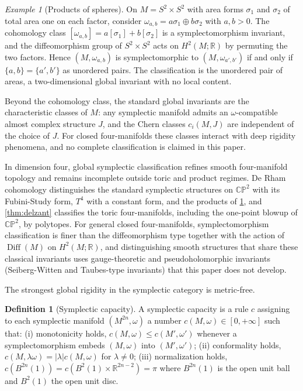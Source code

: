 \documentclass[11pt,letterpaper]{article}
\theoremstyle{definition}
\newtheorem{definition}[theorem]{Definition}
\theoremstyle{remark}
\newtheorem{example}[theorem]{Example}
\begin{document}
\begin{example}[Products of spheres]
\label{ex:product-spheres}
On $M = S^{2} \times S^{2}$ with area forms $\sigma_1$ and $\sigma_2$ of total area one on each factor, consider $\omega_{a, b} = a \sigma_1 \oplus b \sigma_2$ with $a, b > 0$. The cohomology class $[\omega_{a, b}] = a [\sigma_1] + b [\sigma_2]$ is a symplectomorphism invariant, and the diffeomorphism group of $S^{2} \times S^{2}$ acts on $H^{2}(M; \mathbb{R})$ by permuting the two factors. Hence $(M, \omega_{a, b})$ is symplectomorphic to $(M, \omega_{a', b'})$ if and only if $\{a, b\} = \{a', b'\}$ as unordered pairs. The classification is the unordered pair of areas, a two-dimensional global invariant with no local content.
\end{example}

Beyond the cohomology class, the standard global invariants are the characteristic classes of $M$: any symplectic manifold admits an $\omega$-compatible almost complex structure $J$, and the Chern classes $c_i(M, J)$ are independent of the choice of $J$. For closed four-manifolds these classes interact with deep rigidity phenomena, and no complete classification is claimed in this paper.

In dimension four, global symplectic classification refines smooth four-manifold topology and remains incomplete outside toric and product regimes. De Rham cohomology distinguishes the standard symplectic structures on $\mathbb{CP}^{2}$ with its Fubini-Study form, $T^{4}$ with a constant form, and the products of \cref{ex:product-spheres}, and \cref{thm:delzant} classifies the toric four-manifolds, including the one-point blowup of $\mathbb{CP}^{2}$, by polytopes. For general closed four-manifolds, symplectomorphism classification is finer than the diffeomorphism type together with the action of $\operatorname{Diff}(M)$ on $H^{2}(M; \mathbb{R})$, and distinguishing smooth structures that share these classical invariants uses gauge-theoretic and pseudoholomorphic invariants (Seiberg-Witten and Taubes-type invariants) that this paper does not develop.

The strongest global rigidity in the symplectic category is metric-free.

\begin{definition}[Symplectic capacity]
\label{def:capacity}
A symplectic capacity is a rule $c$ assigning to each symplectic manifold $(M^{2n}, \omega)$ a number $c(M, \omega) \in [0, +\infty]$ such that: (i) monotonicity holds, $c(M, \omega) \leq c(M', \omega')$ whenever a symplectomorphism embeds $(M, \omega)$ into $(M', \omega')$; (ii) conformality holds, $c(M, \lambda \omega) = |\lambda| c(M, \omega)$ for $\lambda \neq 0$; (iii) normalization holds, $c(B^{2n}(1)) = c(B^{2}(1) \times \mathbb{R}^{2n-2}) = \pi$ where $B^{2n}(1)$ is the open unit ball and $B^{2}(1)$ the open unit disc.
\end{definition}
\end{document}
